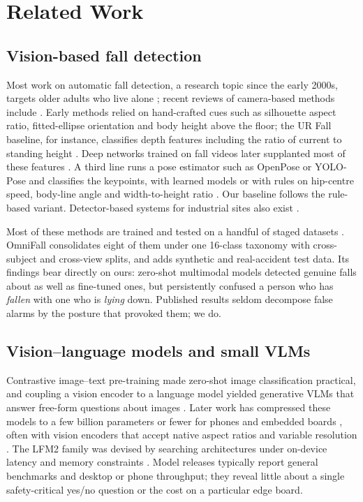 \section{Related Work}
\label{sec:related}

\subsection{Vision-based fall detection}
Most work on automatic fall detection, a research topic since the early 2000s, targets older adults who live alone \cite{mubashir2013survey,igual2013challenges}; recent reviews of camera-based methods include \cite{gutierrez2021review,alam2022review}. Early methods relied on hand-crafted cues such as silhouette aspect ratio, fitted-ellipse orientation and body height above the floor; the UR Fall baseline, for instance, classifies depth features including the ratio of current to standing height \cite{kwolek2014urfall}. Deep networks trained on fall videos later supplanted most of these features \cite{alam2022review}. A third line runs a pose estimator such as OpenPose \cite{cao2021openpose} or YOLO-Pose \cite{maji2022yolopose} and classifies the keypoints, with learned models \cite{ramirez2021skeleton} or with rules on hip-centre speed, body-line angle and width-to-height ratio \cite{chen2020openposefall}. Our baseline follows the rule-based variant. Detector-based systems for industrial sites also exist \cite{pereira2024industrialfall}.

Most of these methods are trained and tested on a handful of staged datasets \cite{kwolek2014urfall,martinez2019upfall,auvinet2010mcfd,charfi2013le2i}. OmniFall \cite{schneider2025omnifall} consolidates eight of them under one 16-class taxonomy with cross-subject and cross-view splits, and adds synthetic and real-accident test data. Its findings bear directly on ours: zero-shot multimodal models detected genuine falls about as well as fine-tuned ones, but persistently confused a person who has \textit{fallen} with one who is \textit{lying} down. Published results seldom decompose false alarms by the posture that provoked them; we do.

\subsection{Vision--language models and small VLMs}
Contrastive image--text pre-training \cite{radford2021clip} made zero-shot image classification practical, and coupling a vision encoder to a language model yielded generative VLMs that answer free-form questions about images \cite{li2023blip2,liu2023llava}. Later work has compressed these models to a few billion parameters or fewer for phones and embedded boards \cite{chu2023mobilevlm,beyer2024paligemma,marafioti2025smolvlm,bai2025qwen25vl,amini2025lfm2,qwen2026qwen35}, often with vision encoders that accept native aspect ratios and variable resolution \cite{tschannen2025siglip2}. The LFM2 family was devised by searching architectures under on-device latency and memory constraints \cite{amini2025lfm2}. Model releases typically report general benchmarks and desktop or phone throughput; they reveal little about a single safety-critical yes/no question or the cost on a particular edge board.

